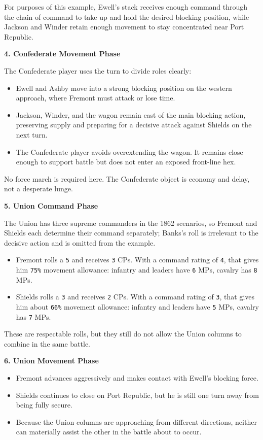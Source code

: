 \documentclass[11pt]{article}
\begin{document}
For purposes of this example, Ewell's stack receives enough command through the chain of command to take up and hold the desired blocking position, while Jackson and Winder retain enough movement to stay concentrated near Port Republic.

\textbf{4. Confederate Movement Phase}

The Confederate player uses the turn to divide roles clearly:

\begin{itemize}
\item Ewell and Ashby move into a strong blocking position on the western approach, where Fremont must attack or lose time.
\item Jackson, Winder, and the wagon remain east of the main blocking action, preserving supply and preparing for a decisive attack against Shields on the next turn.
\item The Confederate player avoids overextending the wagon. It remains close enough to support battle but does not enter an exposed front-line hex.
\end{itemize}

No force march is required here. The Confederate object is economy and delay, not a desperate lunge.

\textbf{5. Union Command Phase}

The Union has three supreme commanders in the 1862 scenarios, so Fremont and Shields each determine their command separately; Banks's roll is irrelevant to the decisive action and is omitted from the example.

\begin{itemize}
\item Fremont rolls a \texttt{5} and receives \texttt{3} CPs. With a command rating of \texttt{4}, that gives him \texttt{75\%} movement allowance: infantry and leaders have \texttt{6} MPs, cavalry has \texttt{8} MPs.
\item Shields rolls a \texttt{3} and receives \texttt{2} CPs. With a command rating of \texttt{3}, that gives him about \texttt{66\%} movement allowance: infantry and leaders have \texttt{5} MPs, cavalry has \texttt{7} MPs.
\end{itemize}

These are respectable rolls, but they still do not allow the Union columns to combine in the same battle.

\textbf{6. Union Movement Phase}

\begin{itemize}
\item Fremont advances aggressively and makes contact with Ewell's blocking force.
\item Shields continues to close on Port Republic, but he is still one turn away from being fully secure.
\item Because the Union columns are approaching from different directions, neither can materially assist the other in the battle about to occur.
\end{itemize}
\end{document}
